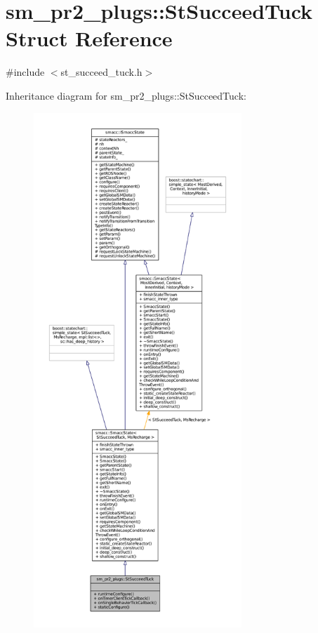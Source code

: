 \hypertarget{structsm__pr2__plugs_1_1StSucceedTuck}{}\section{sm\+\_\+pr2\+\_\+plugs\+:\+:St\+Succeed\+Tuck Struct Reference}
\label{structsm__pr2__plugs_1_1StSucceedTuck}


{\ttfamily \#include $<$st\+\_\+succeed\+\_\+tuck.\+h$>$}



Inheritance diagram for sm\+\_\+pr2\+\_\+plugs\+:\+:St\+Succeed\+Tuck\+:
\nopagebreak
\begin{figure}[H]
\begin{center}
\leavevmode
\includegraphics[height=550pt]{structsm__pr2__plugs_1_1StSucceedTuck__inherit__graph}
\end{center}
\end{figure}


